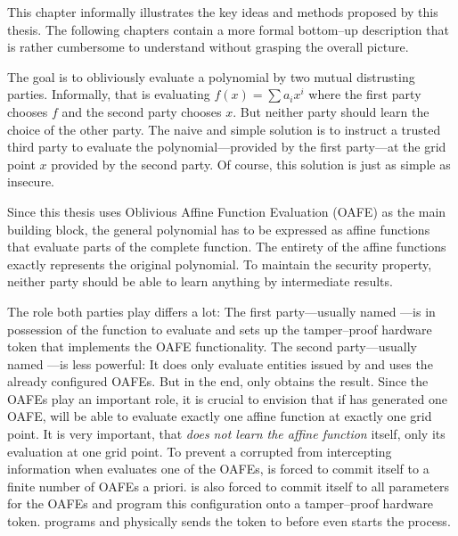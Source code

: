 \label{sec:methods}

%
%
\label{sec:illustration}

This chapter informally illustrates the key ideas and methods proposed by this
thesis. The following chapters contain a more formal bottom--up description that
is rather cumbersome to understand without grasping the overall picture.

The goal is to obliviously evaluate a polynomial by two mutual
distrusting parties. Informally, that is evaluating $f(x) = \sum a_ix^i$ where
the first party chooses $f$ and the second party chooses $x$. But neither
party should learn the choice of the other party. The naive and simple solution
is to instruct a trusted third party to evaluate the polynomial---provided by
the first party---at the grid point $x$ provided by the second party.
Of course, this solution is just as simple as insecure.

Since this thesis uses Oblivious Affine Function Evaluation
(OAFE)\cite{davidgoliath} as the main building block, the general polynomial has
to be expressed as affine functions that evaluate parts of the complete
function. The entirety of the affine functions exactly represents the original
polynomial. To maintain the security property, neither party should be able to
learn anything by intermediate results.

The role both parties play differs a lot: The first party---usually named
\JWpOne{}---is in possession of the function to evaluate and sets up the
tamper--proof hardware token that implements the OAFE functionality. The second
party---usually named \JWpTwo{}---is less powerful: It does only evaluate
entities issued by \JWpOne{} and uses the already configured OAFEs. But in the
end, only \JWpTwo{} obtains the result.  Since the OAFEs play an important role,
it is crucial to envision that if \JWpOne{} has generated one OAFE, \JWpTwo{}
will be able to evaluate exactly one affine function at exactly one grid point.
It is very important, that \JWpTwo{} \emph{does not learn the affine function}
itself, only its evaluation at one grid point. To prevent a corrupted \JWpOne{}
from intercepting information when \JWpTwo{} evaluates one of the OAFEs,
\JWpOne{} is forced to commit itself to a finite number of OAFEs a priori.
\JWpOne{} is also forced to commit itself to all parameters for the OAFEs and
program this configuration onto a tamper--proof hardware token. \JWpOne{}
programs and physically sends the token to \JWpTwo{} before \JWpTwo{} even
starts the process.

